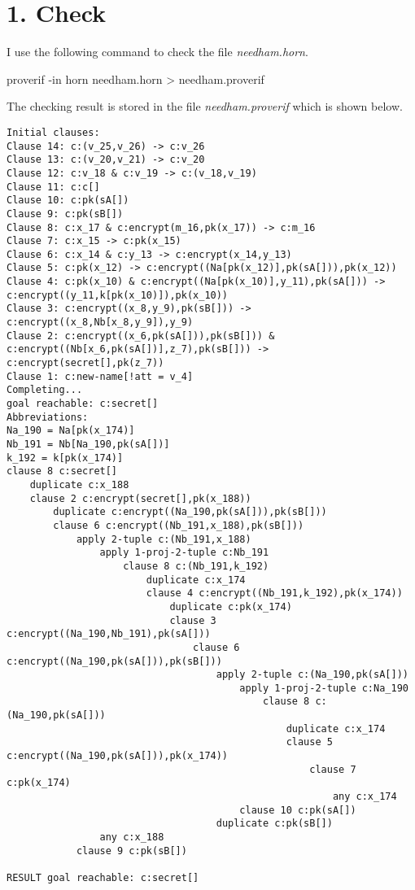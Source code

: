 \documentclass[a4paper, 12pt]{report}
\begin{document}
    \section*{1. Check}
        I use the following command to check the file \emph{needham.horn}.
        \begin{commandshell}
proverif -in horn needham.horn > needham.proverif
        \end{commandshell}
        The checking result is stored in the file \emph{needham.proverif} which is shown below.
        \begin{lstlisting}[frame=single]
Initial clauses:
Clause 14: c:(v_25,v_26) -> c:v_26
Clause 13: c:(v_20,v_21) -> c:v_20
Clause 12: c:v_18 & c:v_19 -> c:(v_18,v_19)
Clause 11: c:c[]
Clause 10: c:pk(sA[])
Clause 9: c:pk(sB[])
Clause 8: c:x_17 & c:encrypt(m_16,pk(x_17)) -> c:m_16
Clause 7: c:x_15 -> c:pk(x_15)
Clause 6: c:x_14 & c:y_13 -> c:encrypt(x_14,y_13)
Clause 5: c:pk(x_12) -> c:encrypt((Na[pk(x_12)],pk(sA[])),pk(x_12))
Clause 4: c:pk(x_10) & c:encrypt((Na[pk(x_10)],y_11),pk(sA[])) -> c:encrypt((y_11,k[pk(x_10)]),pk(x_10))
Clause 3: c:encrypt((x_8,y_9),pk(sB[])) -> c:encrypt((x_8,Nb[x_8,y_9]),y_9)
Clause 2: c:encrypt((x_6,pk(sA[])),pk(sB[])) & c:encrypt((Nb[x_6,pk(sA[])],z_7),pk(sB[])) -> c:encrypt(secret[],pk(z_7))
Clause 1: c:new-name[!att = v_4]
Completing...
goal reachable: c:secret[]
Abbreviations:
Na_190 = Na[pk(x_174)]
Nb_191 = Nb[Na_190,pk(sA[])]
k_192 = k[pk(x_174)]
clause 8 c:secret[]
    duplicate c:x_188
    clause 2 c:encrypt(secret[],pk(x_188))
        duplicate c:encrypt((Na_190,pk(sA[])),pk(sB[]))
        clause 6 c:encrypt((Nb_191,x_188),pk(sB[]))
            apply 2-tuple c:(Nb_191,x_188)
                apply 1-proj-2-tuple c:Nb_191
                    clause 8 c:(Nb_191,k_192)
                        duplicate c:x_174
                        clause 4 c:encrypt((Nb_191,k_192),pk(x_174))
                            duplicate c:pk(x_174)
                            clause 3 c:encrypt((Na_190,Nb_191),pk(sA[]))
                                clause 6 c:encrypt((Na_190,pk(sA[])),pk(sB[]))
                                    apply 2-tuple c:(Na_190,pk(sA[]))
                                        apply 1-proj-2-tuple c:Na_190
                                            clause 8 c:(Na_190,pk(sA[]))
                                                duplicate c:x_174
                                                clause 5 c:encrypt((Na_190,pk(sA[])),pk(x_174))
                                                    clause 7 c:pk(x_174)
                                                        any c:x_174
                                        clause 10 c:pk(sA[])
                                    duplicate c:pk(sB[])
                any c:x_188
            clause 9 c:pk(sB[])

RESULT goal reachable: c:secret[]
        \end{lstlisting}
\end{document}
